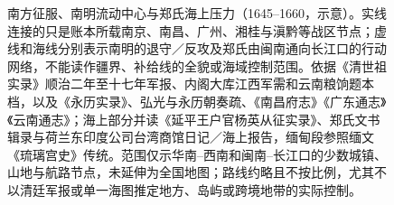 \begin{figure}[htbp]
  \caption{南方征服、南明流动中心与郑氏海上压力（1645--1660，示意）。实线连接的只是账本所载南京、南昌、广州、湘桂与滇黔等战区节点；虚线和海线分别表示南明的退守／反攻及郑氏由闽南通向长江口的行动网络，不能读作疆界、补给线的全貌或海域控制范围。依据《清世祖实录》顺治二年至十七年军报、内阁大库江西军需和云南粮饷题本档，以及《永历实录》、弘光与永历朝奏疏、《南昌府志》《广东通志》《云南通志》；海上部分并读《延平王户官杨英从征实录》、郑氏文书辑录与荷兰东印度公司台湾商馆日记／海上报告，缅甸段参照缅文《琉璃宫史》传统。范围仅示华南--西南和闽南--长江口的少数城镇、山地与航路节点，未延伸为全国地图；路线约略且不按比例，尤其不以清廷军报或单一海图推定地方、岛屿或跨境地带的实际控制。}
  \label{fig:southern-conquest-southern-ming-sea}
\end{figure}

